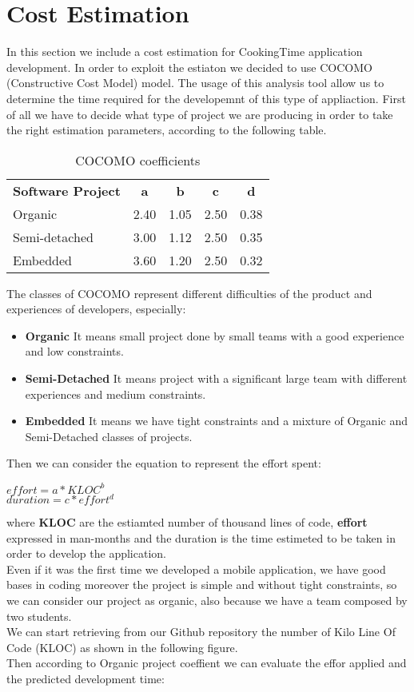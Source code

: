 \chapter{Cost Estimation}
In this section we include a cost estimation for CookingTime application development. In order to exploit the estiaton we decided to use COCOMO (Constructive Cost Model) model. The usage of this analysis tool allow us to determine the time required for the developemnt of this type of appliaction.
First of all we have to decide what type of project we are producing in order to take the right estimation parameters, according to the following table.\\
\begin{table}
	\centering
	\begin{tabular}{|l|c|c|c|c|}
	\textbf{Software Project}& \textbf{a}& \textbf{b}& \textbf{c}& \textbf{d}\\
	Organic & 2.40 & 1.05 & 2.50 & 0.38 \\
	Semi-detached & 3.00 & 1.12 & 2.50 & 0.35 \\
	Embedded & 3.60 & 1.20 & 2.50 & 0.32 \\
	\end{tabular}
	\caption{COCOMO coefficients}
\end{table}
The classes of COCOMO represent different difficulties of the product and experiences of developers, especially:
\begin{itemize}
	\item \textbf{Organic} It means small project done by small teams with a good experience and low constraints.
	\item \textbf{Semi-Detached} It means project with a significant large team with different experiences and medium constraints.
	\item \textbf{Embedded} It means we have tight constraints and a mixture of Organic and Semi-Detached classes of projects.
\end{itemize}
Then we can consider the equation to represent the effort spent:\\
\begin{center}
$ effort = a * KLOC ^{b}$\\
$ duration = c * effort^{d}$\\
\end{center}
where \textbf{KLOC} are the estiamted number of thousand lines of code, \textbf{effort} expressed in man-months and the duration is the time estimeted to be taken in order to develop the application.\\
Even if it was the first time we developed a mobile application, we have good bases in coding moreover the project is simple and without tight constraints, so we can consider our project as organic, also because we have a team composed by two students.\\
We can start retrieving from our Github repository the number of Kilo Line Of Code (KLOC) as shown in the following figure.\\
Then according to Organic project coeffient we can evaluate the effor applied and the predicted development time:

